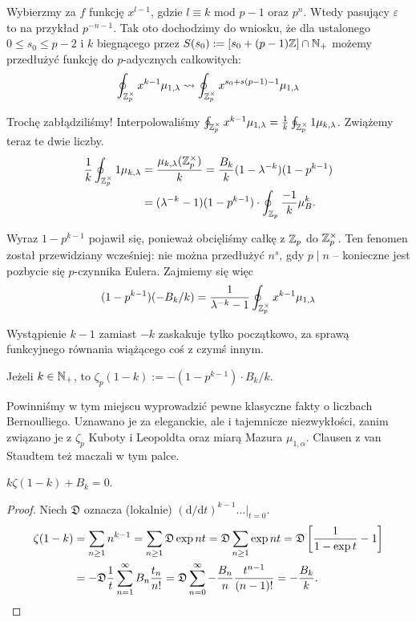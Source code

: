 Wybierzmy za $f$ funkcję $x^{l-1}$, gdzie $l \equiv k$ mod $p-1$ oraz $p^n$.
Wtedy pasujący $\varepsilon$ to na przykład $p^{-n-1}$.
Tak oto dochodzimy do wniosku, że dla ustalonego $0 \le s_0 \le p -2$ i $k$ biegnącego przez $S(s_0) := [s_0 + (p - 1) \mathbb Z] \cap \mathbb N_+$ możemy przedłużyć funkcję do $p$-adycznych całkowitych:
\[
	\oint_{\mathbb Z_p^\times} x^{k-1} \mu_{1, \lambda} \rightsquigarrow \oint_{\mathbb Z_p^\times} x^{s_0 + s(p-1) - 1} \mu_{1, \lambda}
\]

Trochę zabłądziliśmy!
Interpolowaliśmy $\oint_{\mathbb Z_p^\times} x^{k-1} \mu_{1, \lambda} = \frac 1 k \oint_{\mathbb Z_p^\times} 1 \mu_{k, \lambda}$.
Zwiążemy teraz te dwie liczby.
\begin{align*}
\frac 1 k \oint_{\mathbb Z_p^\times} 1 \mu_{k, \lambda} & = \frac {\mu_{k, \lambda} (\mathbb Z_p^\times)}{k} = \frac{B_k}{k} (1 - \lambda^{-k})(1 - p^{k-1}) \\
& = (\lambda^{-k} - 1) (1 - p^{k - 1}) \cdot \oint_{\mathbb Z_p} \frac{-1}{k} \mu_B^k.
\end{align*}

Wyraz $1 - p^{k-1}$ pojawił się, ponieważ obcięliśmy całkę z $\mathbb Z_p$ do $\mathbb Z_p^\times$.
Ten fenomen został przewidziany wcześniej: nie można przedłużyć $n^s$, gdy $p \mid n$ -- konieczne jest pozbycie się $p$-czynnika Eulera.
Zajmiemy się więc
\[
	(1 - p^{k-1})(-B_k / k) = \frac{1}{\lambda^{-k} - 1} \oint_{\mathbb Z_p^\times} x^{k-1} \mu_{1, \lambda}
\]

Wystąpienie $k - 1$ zamiast $-k$ zaskakuje tylko początkowo, za sprawą funkcyjnego równania wiążącego coś z czymś innym.

\begin{definicja}
	Jeżeli $k \in \mathbb N_+$, to $\zeta_p(1 - k) := -(1 - p^{k - 1}) \cdot B_k/k$.
\end{definicja}

Powinniśmy w tym miejscu wyprowadzić pewne klasyczne fakty o liczbach Bernoulliego.
Uznawano je za eleganckie, ale i tajemnicze niezwykłości, zanim związano je z $\zeta_p$ Kuboty i Leopoldta oraz miarą Mazura $\mu_{1, \alpha}$.
Clausen z van Staudtem też maczali w tym palce.

\begin{fakt}
	$k \zeta(1-k) + B_k = 0$.
\end{fakt}

\begin{proof}
	Niech $\mathfrak D$ oznacza (lokalnie) $(\textrm{d}/ \textrm{d}t)^{k-1} \left. \ldots \right|_{t = 0}$.
	\begin{align*}
		\zeta(1-k) 
		& = \sum_{n \ge 1} n^{k-1} 
		= \sum_{n \ge 1} \mathfrak D \exp nt 
		= \mathfrak D \sum_{n \ge 1} \exp nt 
		= \mathfrak D \left[\frac{1}{1 - \exp t} - 1\right] \\
		& = - \mathfrak D \frac 1 t \sum_{n = 1}^\infty B_n \frac{t_n}{n!}
		= \mathfrak D \sum_{n=0}^\infty - \frac{B_n} n \frac{t^{n-1}}{(n-1)!} = - \frac{B_k}k. \qedhere
	\end{align*}
\end{proof}

